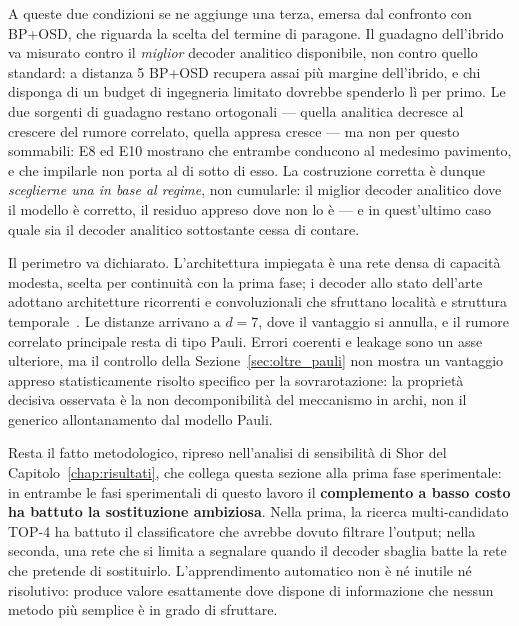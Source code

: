 A queste due condizioni se ne aggiunge una terza, emersa dal confronto con BP+OSD, che riguarda la scelta del termine di paragone. Il guadagno dell'ibrido va misurato contro il \emph{miglior} decoder analitico disponibile, non contro quello standard: a distanza 5 BP+OSD recupera assai più margine dell'ibrido, e chi disponga di un budget di ingegneria limitato dovrebbe spenderlo lì per primo. Le due sorgenti di guadagno restano ortogonali --- quella analitica decresce al crescere del rumore correlato, quella appresa cresce --- ma non per questo sommabili: E8 ed E10 mostrano che entrambe conducono al medesimo pavimento, e che impilarle non porta al di sotto di esso. La costruzione corretta è dunque \emph{sceglierne una in base al regime}, non cumularle: il miglior decoder analitico dove il modello è corretto, il residuo appreso dove non lo è --- e in quest'ultimo caso quale sia il decoder analitico sottostante cessa di contare.

Il perimetro va dichiarato. L'architettura impiegata è una rete densa di
capacità modesta, scelta per continuità con la prima fase; i decoder allo
stato dell'arte adottano architetture ricorrenti e convoluzionali che
sfruttano località e struttura temporale~\cite{alphaqubit2024}. Le
distanze arrivano a $d=7$, dove il vantaggio si annulla, e il rumore
correlato principale resta di tipo Pauli. Errori coerenti e leakage sono
un asse ulteriore, ma il controllo della Sezione~\ref{sec:oltre_pauli}
non mostra un vantaggio appreso statisticamente risolto specifico per la
sovrarotazione: la proprietà decisiva osservata è la non decomponibilità
del meccanismo in archi, non il generico allontanamento dal modello Pauli.

Resta il fatto metodologico, ripreso nell'analisi di sensibilità di Shor del Capitolo~\ref{chap:risultati}, che collega questa sezione alla prima fase sperimentale: in entrambe le fasi sperimentali di questo lavoro il \textbf{complemento a basso costo ha battuto la sostituzione ambiziosa}. Nella prima, la ricerca multi-candidato TOP-4 ha battuto il classificatore che avrebbe dovuto filtrare l'output; nella seconda, una rete che si limita a segnalare quando il decoder sbaglia batte la rete che pretende di sostituirlo. L'apprendimento automatico non è né inutile né risolutivo: produce valore esattamente dove dispone di informazione che nessun metodo più semplice è in grado di sfruttare.

\fi
